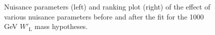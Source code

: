 \begin{figure}[H]
  \centering
  \caption{Nuisance parameters (left) and ranking plot (right) of the effect of various nuisance parameters before and after the fit for the 1000 GeV $W'_{\text{L}}$ mass hypotheses.}
  \label{fig:NuisParAndRanking_WpLH1000}
\end{figure}
